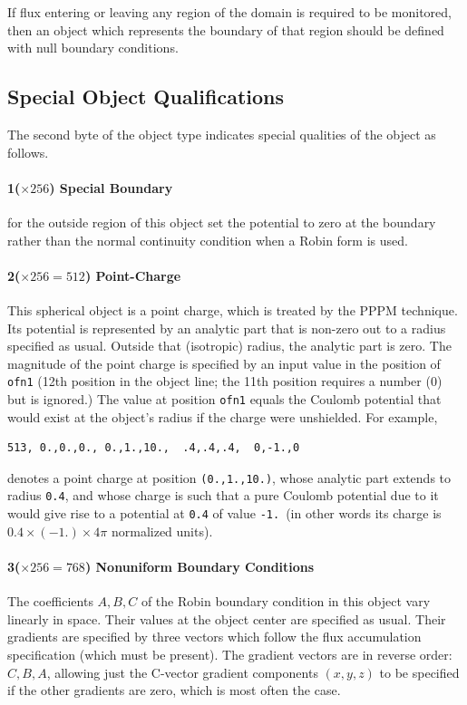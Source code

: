 \documentclass[12pt]{article}
\begin{document}
If flux entering or leaving any region of the domain is required to be
monitored, then an object which represents the boundary of that region
should be defined with null boundary conditions. 

\subsection{Special Object Qualifications}

The second byte of the object type indicates special qualities of the
object as follows. 

\paragraph{1($\times256$) Special Boundary} for the outside region of this
object set the potential to zero at the boundary rather than the
normal continuity condition when a Robin form is used.

\paragraph{2($\times256=512$) Point-Charge} This spherical object is a
point charge, which is treated by the PPPM technique. Its potential is
represented by an analytic part that is non-zero out to a radius
specified as usual. Outside that (isotropic) radius, the analytic part
is zero. The magnitude of the point charge is specified by an input
value in the position of \verb!ofn1! (12th position in the object
line; the 11th position requires a number (0) but is ignored.) The
value at position \verb!ofn1! equals the Coulomb potential that would
exist at the object's radius if the charge were unshielded.
For example,
\begin{verbatim}
513, 0.,0.,0., 0.,1.,10.,  .4,.4,.4,  0,-1.,0
\end{verbatim}
denotes a point charge at position \verb!(0.,1.,10.)!, whose
analytic part extends to radius \verb!0.4!, and whose charge is such
that a pure Coulomb potential due to it would give rise to a potential
at \verb!0.4! of value \verb!-1.!\ (in other words its charge is
$0.4\times(-1.)\times4\pi$ normalized units). 

\paragraph{3($\times256=768$) Nonuniform Boundary Conditions} The
coefficients $A,B,C$ of the Robin boundary condition in this object vary
linearly in space. Their values at the object center are specified as
usual. Their gradients are specified by three vectors which follow the
flux accumulation specification (which must be present). The gradient
vectors are in reverse order: $C, B, A$, allowing just the C-vector
gradient components
$(x,y,z)$ to be specified if the other gradients are zero, which is
most often the case.
\end{document}
